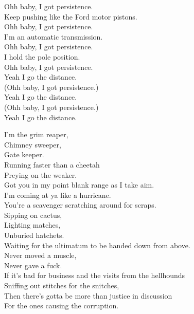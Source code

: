 Ohh baby, I got persistence. \\
Keep pushing like the Ford motor pistons. \\
Ohh baby, I got persistence. \\
I'm an automatic transmission. \\
Ohh baby, I got persistence. \\
I hold the pole position. \\
Ohh baby, I got persistence. \\
Yeah I go the distance. \\

(Ohh baby, I got persistence.) \\
Yeah I go the distance. \\
(Ohh baby, I got persistence.) \\
Yeah I go the distance. \\





I'm the grim reaper, \\
Chimney sweeper, \\
Gate keeper. \\
Running faster than a cheetah \\
Preying on the weaker. \\
Got you in my point blank range as I take aim. \\
I'm coming at ya like a hurricane. \\

You're a scavenger scratching around for scraps. \\
Sipping on cactus, \\
Lighting matches, \\
Unburied hatchets. \\
Waiting for the ultimatum to be handed down from above. \\
Never moved a muscle, \\
Never gave a fuck. \\

If it's bad for business and the visits from the hellhounds \\
Sniffing out stitches for the snitches, \\
Then there's gotta be more than justice in discussion \\
For the ones causing the corruption. \\

